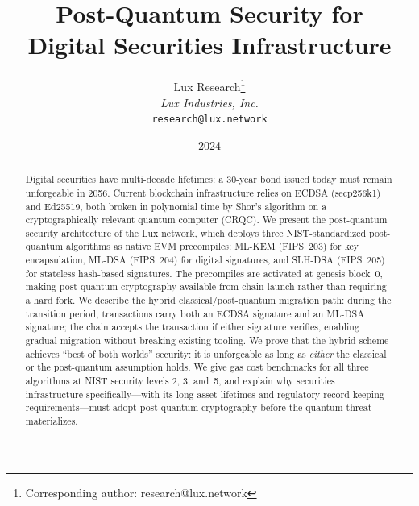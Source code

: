 \documentclass[11pt,a4paper]{article}
\title{Post-Quantum Security for\\Digital Securities Infrastructure}
\author{
Lux Research\thanks{Corresponding author: research@lux.network}\\
\textit{Lux Industries, Inc.}\\
\texttt{research@lux.network}
}
\date{2024}
\begin{document}
\luxcoverpage

\begin{abstract}
Digital securities have multi-decade lifetimes: a 30-year bond issued
today must remain unforgeable in 2056.  Current blockchain infrastructure
relies on ECDSA (secp256k1) and Ed25519, both broken in polynomial time
by Shor's algorithm on a cryptographically relevant quantum computer
(CRQC).  We present the post-quantum security architecture of the Lux
network, which deploys three NIST-standardized post-quantum algorithms
as native EVM precompiles: ML-KEM (FIPS~203) for key encapsulation,
ML-DSA (FIPS~204) for digital signatures, and SLH-DSA (FIPS~205) for
stateless hash-based signatures.  The precompiles are activated at
genesis block~0, making post-quantum cryptography available from chain
launch rather than requiring a hard fork.  We describe the hybrid
classical/post-quantum migration path: during the transition period,
transactions carry both an ECDSA signature and an ML-DSA signature;
the chain accepts the transaction if either signature verifies,
enabling gradual migration without breaking existing tooling.  We prove
that the hybrid scheme achieves ``best of both worlds'' security:
it is unforgeable as long as \emph{either} the classical or the
post-quantum assumption holds.  We give gas cost benchmarks for all
three algorithms at NIST security levels 2, 3, and~5, and explain
why securities infrastructure specifically---with its long asset
lifetimes and regulatory record-keeping requirements---must adopt
post-quantum cryptography before the quantum threat materializes.
\end{abstract}

\tableofcontents
\newpage










\end{document}
